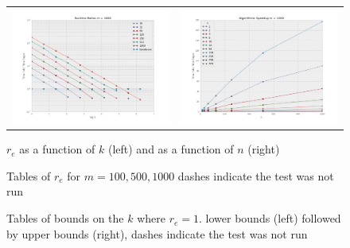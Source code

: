 \begin{figure}
\begin{tabular}{cc}
\includegraphics[width=\plotwidth]{tratio1000.png} & \includegraphics[width=\plotwidth]{tratioarc1000.png}\\
\end{tabular}
\caption{$r_e$ as a function of $k$ (left) and as a function of $n$ (right) }
\label{fig:1000plot}
\end{figure}
\begin{figure}
\centering

\caption{Tables of $r_e$ for $m=100,500,1000$ dashes indicate the test was not run}
\end{figure}

\begin{figure}
\centering

\caption{Tables of bounds on the $k$ where $r_e=1$. lower bounds (left) followed by upper bounds (right), dashes indicate the test was not run}
\end{figure}